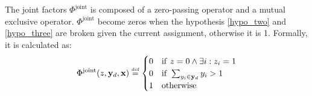 The joint factors $\Phi^{\text{joint}}$ is composed of a zero-passing operator and a mutual exclusive operator. $\Phi^{\text{joint}}$ become zeros when the hypothesis \ref{hypo_two} and \ref{hypo_three} are broken given the current assignment, otherwise it is 1. Formally, it is calculated as:
\[
\Phi^{\text{joint}}(z,\mathbf{y}_d,\mathbf{x})
\stackrel{\text{\tiny def}}{=}
\begin{cases}
0  & {\rm if} ~ z=0 \land \exists i : z_i = 1  \\
0  & {\rm if} ~ \sum_{y_i\in \mathbf{y}_d} y_i > 1  \\
1  & {\rm otherwise} \\
\end{cases}
\]






